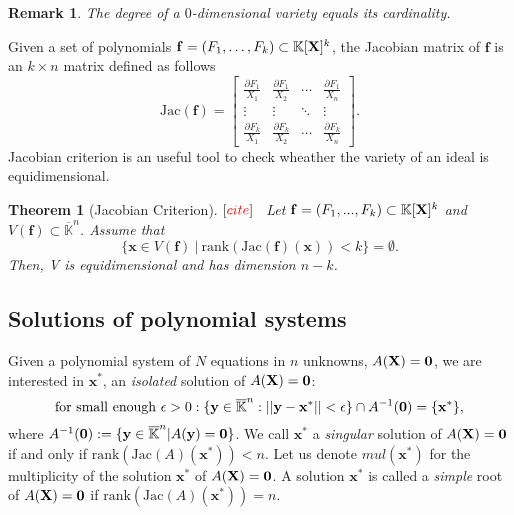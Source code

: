 \documentclass[11pt]{article}
\numberwithin{Property}{section}
\newtheorem{Theorem}{Theorem}%
\numberwithin{Theorem}{section}
\numberwithin{Proposition}{section}
\numberwithin{Lemma}{section}
\numberwithin{Corollary}{section}
\numberwithin{Definition}{section}
\newtheorem{Remark}{Remark}%
\numberwithin{Remark}{section}
\numberwithin{Conjecture}{section}
\numberwithin{Problem}{section}
\numberwithin{Example}{section}
\numberwithin{Claim}{section}
\def\bar{\overline}
\newcommand{\field}{\mathbb{K}} %
\newcommand{\mat}[1]{\mathbf{\MakeUppercase{#1}}} %
\newcommand{\todo}[1]{\textcolor{red}{#1}} %
\begin{document}
\begin{Remark} The degree of a $0$-dimensional variety equals its cardinality.
\end{Remark}
Given a set of polynomials $\mathbf{f} = (F_1, \ldots, F_k) \subset \field[\mat{X}]^k$, the Jacobian matrix of $\mathbf{f}$ is an $k \times n$ matrix defined as follows 
\[
\mathrm{Jac}(\mathbf{f}) = \left[ \begin{matrix}
\frac{\partial F_1}{X_1} & \frac{\partial F_1}{X_2} & \cdots & \frac{\partial F_1}{X_n}\\
\vdots & \vdots & \ddots & \vdots\\
\frac{\partial F_k}{X_1} & \frac{\partial F_k}{X_2} & \cdots & \frac{\partial F_k}{X_n}
\end{matrix} \right].
\]
Jacobian criterion is an useful tool to check wheather the variety of an ideal is equidimensional. 
\begin{Theorem}[Jacobian Criterion] $[\todo{cite}]$  \
Let $\mathbf{f} = (F_1, ..., F_k) \subset \field[\mat{X}]^k$ and $V(\mathbf{f}) \subset \bar{\field}^n $. Assume that 
\[
\{\mathbf{x} \in V(\mathbf{f}) \ | \ \mathrm{rank}(\mathrm{Jac}(\mathbf{f})({\mathbf{x}})) < k\} = \emptyset .
\] Then, V is equidimensional and has dimension $n - k$.
\end{Theorem}

\subsection{Solutions of polynomial systems}
Given a polynomial system of $N$ equations in $n$ unknowns, $A(\mat{X}) = \mat{0}$, we are interested in $\mathbf{x}^*$, an \emph{isolated} solution of $A(\mat{X}) = \mat{0}$:
\[
\mathrm{for \ small \ enough} \ \epsilon > 0 : \{\mathbf{y} \in \bar{\field}^n : ||\mathbf{y} - \mathbf{x}^*|| < \epsilon\} \cap A^{-1}(\mat{0}) = \{\mathbf{x}^*\}, 
\] where $A^{-1}(\mat{0}) := \{\mathbf{y} \in \bar{\field}^n | A(\mathbf{y}) = \mat{0}\}$. We call $\mathbf{x}^*$ a \emph{singular} solution of $A(\mat{X}) = \mat{0}$ if and only if $\mathrm{rank}(\mathrm{Jac}(A)(\mathbf{x}^*)) < n$.  Let us denote $mul(\mathbf{x}^*)$ for the multiplicity of the solution $\mathbf{x}^*$ of $A(\mat{X}) = \mat{0}$.   A solution $\mathbf{x}^*$ is called a \emph{simple} root of $A(\mat{X}) = \mat{0}$ if  $\mathrm{rank}(\mathrm{Jac}(A)(\mathbf{x}^*)) = n$.
\end{document}
